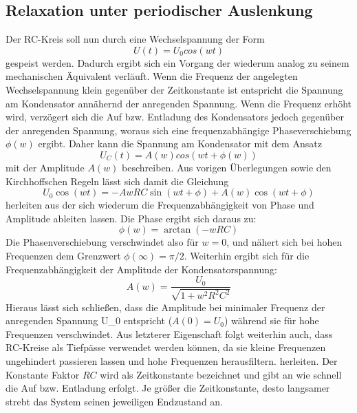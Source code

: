 \subsection{Relaxation unter periodischer Auslenkung}
Der RC-Kreis soll nun durch eine Wechselspannung der Form 
\begin{equation}
U(t)=U_0cos(wt)
\end{equation}
gespeist werden. Dadurch ergibt sich ein Vorgang der wiederum analog zu seinem mechanischen Äquivalent verläuft. Wenn die Frequenz der angelegten Wechselspannung
klein gegenüber der Zeitkonstante ist entspricht die Spannung am Kondensator annähernd der anregenden Spannung. Wenn die Frequenz erhöht wird, verzögert sich die 
Auf bzw. Entladung des Kondensators jedoch gegenüber der anregenden Spannung, woraus sich eine frequenzabhängige Phaseverschiebung $\phi(w)$ ergibt. Daher kann 
die Spannung am Kondensator mit dem Ansatz
\begin{equation}
U_C(t)=A(w)cos(wt+\phi(w))
\end{equation}
mit der Amplitude $A(w)$ beschreiben. Aus vorigen Überlegungen sowie den Kirchhoffschen Regeln lässt sich damit die Gleichung 
\begin{equation*}
U_0\cos(wt)=-AwRC\sin(wt+\phi)+A(w)\cos(wt+\phi)
\end{equation*}
herleiten aus der sich wiederum die Frequenzabhängigkeit von Phase und Amplitude ableiten lassen. Die Phase ergibt sich daraus zu:
\begin{equation}
\phi(w)=\arctan(-wRC)
\end{equation}
Die Phasenverschiebung verschwindet also für $w=0$, und nähert sich bei hohen Frequenzen dem Grenzwert $\phi(\infty)=\pi/2$.
Weiterhin ergibt sich für die Frequenzabhängigkeit der Amplitude der Kondensatorspannung:
\begin{equation}
A(w)=\frac{U_0}{\sqrt{1+w^2R^2C^2}}
\end{equation}
Hieraus lässt sich schließen, dass die Amplitude bei minimaler Frequenz der anregenden Spannung U_0 entspricht ($A(0)=U_0$) während
sie für hohe Frequenzen verschwindet. Aus letzterer Eigenschaft folgt weiterhin auch, dass RC-Kreise als Tiefpässe verwendet werden können,
da sie kleine Frequenzen ungehindert passieren lassen und hohe Frequenzen herausfiltern.
herleiten. Der Konstante Faktor $RC$ wird als Zeitkonstante bezeichnet und gibt an wie schnell die Auf bzw. Entladung erfolgt. Je größer die Zeitkonstante,
desto langsamer strebt das System seinen jeweiligen Endzustand an.

